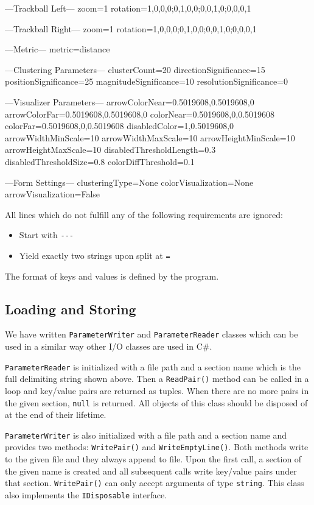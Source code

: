 \begin{code}
---Trackball Left---
zoom=1
rotation=1,0,0,0;0,1,0,0;0,0,1,0;0,0,0,1

---Trackball Right---
zoom=1
rotation=1,0,0,0;0,1,0,0;0,0,1,0;0,0,0,1

---Metric---
metric=distance

---Clustering Parameters---
clusterCount=20
directionSignificance=15
positionSignificance=25
magnitudeSignificance=10
resolutionSignificance=0

---Visualizer Parameters---
arrowColorNear=0.5019608,0.5019608,0
arrowColorFar=0.5019608,0.5019608,0
colorNear=0.5019608,0,0.5019608
colorFar=0.5019608,0,0.5019608
disabledColor=1,0.5019608,0
arrowWidthMinScale=10
arrowWidthMaxScale=10
arrowHeightMinScale=10
arrowHeightMaxScale=10
disabledThresholdLength=0.3
disabledThresholdSize=0.8
colorDiffThreshold=0.1

---Form Settings---
clusteringType=None
colorVisualization=None
arrowVisualization=False
\end{code}

All lines which do not fulfill any of the following requirements are ignored:

\begin{itemize}
\item Start with \verb+---+
\item Yield exactly two strings upon split at \verb+=+
\end{itemize}

The format of keys and values is defined by the program.
\subsection{Loading and Storing}

We have written \verb+ParameterWriter+ and \verb+ParameterReader+ classes which can be used in a similar way other I/O classes are used in C\#.

\verb+ParameterReader+ is initialized with a file path and a section name which is the full delimiting string shown above. Then a \verb+ReadPair()+ method can be called in a loop and key/value pairs are returned as tuples. When there are no more pairs in the given section, \verb+null+ is returned. All objects of this class should be disposed of at the end of their lifetime.

\verb+ParameterWriter+ is also initialized with a file path and a section name and provides two methods: \verb+WritePair()+ and \verb+WriteEmptyLine()+. Both methods write to the given file and they always append to file. Upon the first call, a section of the given name is created and all subsequent calls write key/value pairs under that section. \verb+WritePair()+ can only accept arguments of type \verb+string+. This class also implements the \verb+IDisposable+ interface.